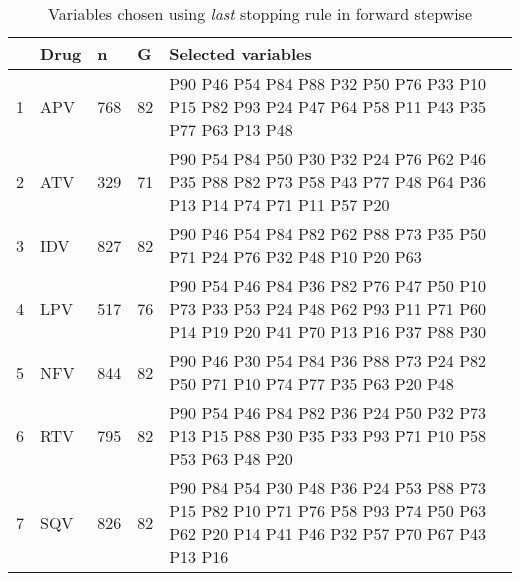 \begin{table}[ht]
\centering
\begin{tabular}{rllll}
  \hline
 & Drug & n & G & Selected variables \\ 
  \hline
1 & APV & 768 & 82 & P90 P46 P54 P84 P88 P32 P50 P76 P33 P10 P15 P82 P93 P24 P47 P64 P58 P11 P43 P35 P77 P63 P13 P48 \\ 
  2 & ATV & 329 & 71 & P90 P54 P84 P50 P30 P32 P24 P76 P62 P46 P35 P88 P82 P73 P58 P43 P77 P48 P64 P36 P13 P14 P74 P71 P11 P57 P20 \\ 
  3 & IDV & 827 & 82 & P90 P46 P54 P84 P82 P62 P88 P73 P35 P50 P71 P24 P76 P32 P48 P10 P20 P63 \\ 
  4 & LPV & 517 & 76 & P90 P54 P46 P84 P36 P82 P76 P47 P50 P10 P73 P33 P53 P24 P48 P62 P93 P11 P71 P60 P14 P19 P20 P41 P70 P13 P16 P37 P88 P30 \\ 
  5 & NFV & 844 & 82 & P90 P46 P30 P54 P84 P36 P88 P73 P24 P82 P50 P71 P10 P74 P77 P35 P63 P20 P48 \\ 
  6 & RTV & 795 & 82 & P90 P54 P46 P84 P82 P36 P24 P50 P32 P73 P13 P15 P88 P30 P35 P33 P93 P71 P10 P58 P53 P63 P48 P20 \\ 
  7 & SQV & 826 & 82 & P90 P84 P54 P30 P48 P36 P24 P53 P88 P73 P15 P82 P10 P71 P76 P58 P93 P74 P50 P63 P62 P20 P14 P41 P46 P32 P57 P70 P67 P43 P13 P16 \\ 
   \hline
\end{tabular}
\caption{Variables chosen using \textit{last} stopping rule in forward stepwise} 
\end{table}

